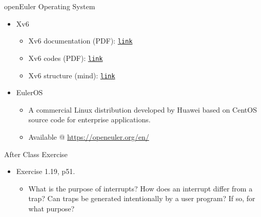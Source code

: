 \documentclass[10pt]{beamer}
\begin{document}
\begin{frame}{openEuler Operating System}
\begin{itemize}
    \item Xv6
    \begin{itemize}
        \item Xv6 documentation (PDF):     \href{https://seunic-my.sharepoint.cn/:b:/g/personal/101011912_seu_edu_cn/EYdcF-SBSqNOlamCf9zcEbUBweJItRDGhnVuyC4JkNWSbw?e=iPfoTS}{\texttt{link}}
        \item Xv6 codes (PDF):     \href{https://seunic-my.sharepoint.cn/:b:/g/personal/101011912_seu_edu_cn/ESodUyrBhS5GmDMV6cCE4ZYBzddjcv8Dn9LgDdSJ1TILFA?e=EGIP6r}{\texttt{link}}
    \item Xv6 structure (mind): \href{https://docs.qq.com/mind/DR1FTZXpzamFYRnhx}{\texttt{link}}
    \end{itemize}
    \item EulerOS 
    \begin{itemize}
        \item A commercial Linux distribution developed by Huawei based on CentOS source code for enterprise applications.
        \item Available @ \url{https://openeuler.org/en/}
    \end{itemize} 
\end{itemize}
    
\end{frame}


\begin{frame}{After Class Exercise}
\begin{itemize}
    \item Exercise 1.19, p51.
    \begin{itemize}
        \item What is the purpose of interrupts? How does an interrupt differ from a trap? Can traps be generated intentionally by a user program? If so, for what purpose?
    \end{itemize}
\end{itemize}
\end{frame}
\end{document}
